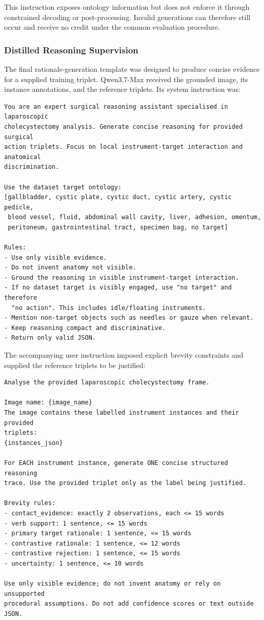 This instruction exposes ontology information but does not enforce it through constrained decoding or post-processing. Invalid generations can therefore still occur and receive no credit under the common evaluation procedure.

\subsubsection{Distilled Reasoning Supervision}

The final rationale-generation template was designed to produce concise evidence for a supplied training triplet. Qwen3.7-Max received the grounded image, its instance annotations, and the reference triplets. Its system instruction was:

\begin{lstlisting}[style=c5prompt]
You are an expert surgical reasoning assistant specialised in laparoscopic
cholecystectomy analysis. Generate concise reasoning for provided surgical
action triplets. Focus on local instrument-target interaction and anatomical
discrimination.

Use the dataset target ontology:
[gallbladder, cystic plate, cystic duct, cystic artery, cystic pedicle,
 blood vessel, fluid, abdominal wall cavity, liver, adhesion, omentum,
 peritoneum, gastrointestinal tract, specimen bag, no target]

Rules:
- Use only visible evidence.
- Do not invent anatomy not visible.
- Ground the reasoning in visible instrument-target interaction.
- If no dataset target is visibly engaged, use "no target" and therefore
  "no action". This includes idle/floating instruments.
- Mention non-target objects such as needles or gauze when relevant.
- Keep reasoning compact and discriminative.
- Return only valid JSON.
\end{lstlisting}

The accompanying user instruction imposed explicit brevity constraints and supplied the reference triplets to be justified:

\begin{lstlisting}[style=c5prompt]
Analyse the provided laparoscopic cholecystectomy frame.

Image name: {image_name}
The image contains these labelled instrument instances and their provided
triplets:
{instances_json}

For EACH instrument instance, generate ONE concise structured reasoning
trace. Use the provided triplet only as the label being justified.

Brevity rules:
- contact_evidence: exactly 2 observations, each <= 15 words
- verb support: 1 sentence, <= 15 words
- primary target rationale: 1 sentence, <= 15 words
- contrastive rationale: 1 sentence, <= 12 words
- contrastive rejection: 1 sentence, <= 15 words
- uncertainty: 1 sentence, <= 10 words

Use only visible evidence; do not invent anatomy or rely on unsupported
procedural assumptions. Do not add confidence scores or text outside JSON.
\end{lstlisting}

